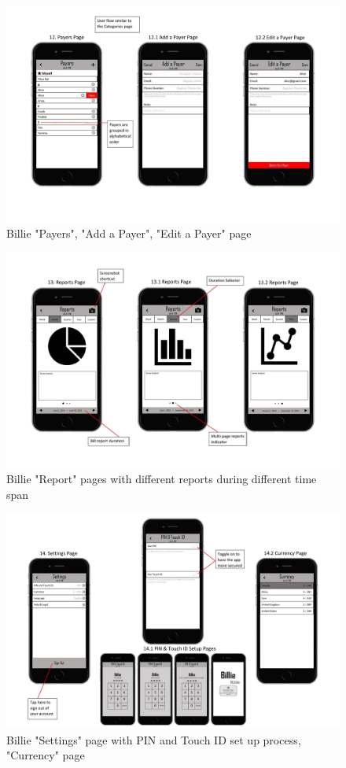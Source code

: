 \documentclass{sigchi}
\begin{document}
 \begin{figure}[h!]
\centering
  \includegraphics[width=1\columnwidth]{User-flow-page-010.jpg}
  \caption{Billie "Payers", "Add a Payer", "Edit a Payer" page}
  \label{fig:figure49}
\end{figure} 
 \begin{figure}[h!]
\centering
  \includegraphics[width=1\columnwidth]{User-flow-page-011.jpg}
  \caption{Billie "Report" pages with different reports during different time span}
  \label{fig:figure50}
\end{figure} 
 \begin{figure}[h!]
\centering
  \includegraphics[width=1\columnwidth]{User-flow-page-012.jpg}
  \caption{Billie "Settings" page with PIN and Touch ID set up process, "Currency" page}
  \label{fig:figure51}
\end{figure} 
\end{document}
